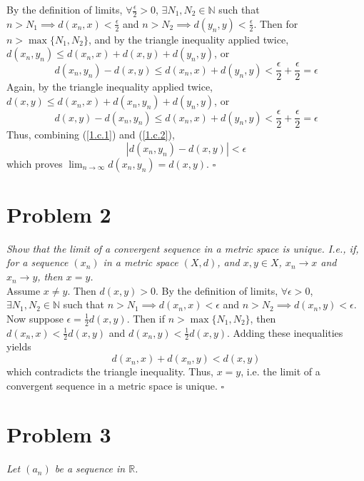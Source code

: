 \documentclass[12pt]{article}
\begin{document}
By the definition of limits, $\forall \frac{\epsilon}{2} > 0$, $\exists N_1, N_2 \in \mathbb{N}$ such that $n > N_1 \implies d(x_n, x) < \frac{\epsilon}{2}$ and $n > N_2 \implies d(y_n, y) < \frac{\epsilon}{2}$.  Then for $n > \max\{N_1, N_2\}$, and by the triangle inequality applied twice, $d(x_n, y_n) \leq d(x_n, x) + d(x, y) + d(y_n, y)$, or
\begin{equation}
	d(x_n, y_n) - d(x, y) \leq d(x_n, x) + d(y_n, y) < \frac{\epsilon}{2} + \frac{\epsilon}{2} = \epsilon
	\label{1.c.1}
\end{equation}
Again, by the triangle inequality applied twice, $d(x, y) \leq d(x_n, x) + d(x_n, y_n) + d(y_n, y)$, or
\begin{equation}
	d(x, y) - d(x_n, y_n) \leq d(x_n, x) + d(y_n, y) < \frac{\epsilon}{2} + \frac{\epsilon}{2} = \epsilon
	\label{1.c.2}
\end{equation}
Thus, combining (\ref{1.c.1}) and (\ref{1.c.2}),
\begin{equation}
	|d(x_n, y_n) - d(x, y)| < \epsilon
\end{equation}
which proves $\lim_{n\rightarrow\infty}d(x_n, y_n) = d(x, y)$. \hfill $\square$

\section*{Problem 2}
{\it Show that the limit of a convergent sequence in a metric space is unique.  I.e., if, for a sequence $(x_n)$ in a metric space $(X, d)$, and $x, y\in X$, $x_n \rightarrow x$ and $x_n \rightarrow y$, then $x = y$.} \\

Assume $x \neq y$.  Then $d(x, y) > 0$.  By the definition of limits, $\forall \epsilon > 0$, $\exists N_1, N_2 \in \mathbb{N}$ such that $n > N_1 \implies d(x_n, x) < \epsilon$ and $n > N_2 \implies d(x_n, y) < \epsilon$.  Now suppose $\epsilon = \frac{1}{2}d(x, y)$.  Then if $n > \max\{N_1, N_2\}$, then $d(x_n, x) < \frac{1}{2}d(x, y)$ and $d(x_n, y) < \frac{1}{2}d(x, y)$.  Adding these inequalities yields
\begin{equation}
	d(x_n, x) + d(x_n, y) < d(x, y)
\end{equation}
which contradicts the triangle inequality.  Thus, $x = y$, i.e. the limit of a convergent sequence in a metric space is unique. \hfill $\square$

\section*{Problem 3}
{\it Let $(a_n)$ be a sequence in $\mathbb{R}$.}
\end{document}
